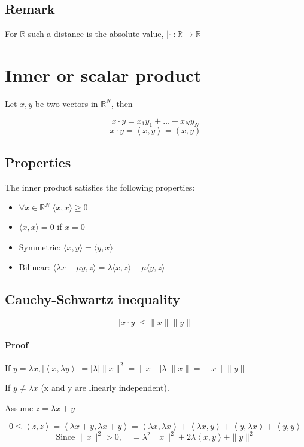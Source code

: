 \documentclass[11pt]{article}
\newcommand{\inner}[2]{\left\langle #1, #2 \right\rangle}
\begin{document}
\subsection*{Remark}
For $\mathbb{R}$ such a distance is the absolute value, $| \cdot | : \mathbb{R} \rightarrow \mathbb{R}$

\section{Inner or scalar product}
Let $x, y$ be two vectors in $\mathbb{R}^N$, then

\[ 
x \cdot y = x_1 y_1 + \dots + x_N y_N
\]
\[
x \cdot y = \inner{x}{y} = (x,y) 
\]

\subsection{Properties}
The inner product satisfies the following properties:
\begin{itemize}
    \item $\forall x \in \mathbb{R}^N \; \langle x, x \rangle \geq 0$
    \item[] $\langle x, x \rangle = 0$ if $x = 0$
    \item Symmetric: $\langle x, y \rangle = \langle y, x \rangle$
    \item Bilinear: $\langle \lambda x + \mu y, z \rangle = \lambda \langle x, z \rangle + \mu \langle y, z \rangle$
\end{itemize}

\subsection{Cauchy-Schwartz inequality}
\[ 
|x \cdot y| \leq \|x\| \|y\|
\]

\paragraph*{Proof}
If $y = \lambda x, |\inner{x}{\lambda y}| = |\lambda| \|x\|^2 = \|x\| |\lambda| \|x\| = \|x\|\|y\|$

If $y \neq \lambda x$ (x and y are linearly independent).

Assume $z = \lambda x + y$

\[ 
0 \leq \inner{z}{z} = \inner{\lambda x + y}{\lambda x + y} = \inner{\lambda x}{\lambda x} + \inner{\lambda x}{y} + \inner{y}{\lambda x} + \inner{y}{y}
\]
\[ 
\text{Since } \|x\|^2 > 0, \quad = \lambda^2 \|x\|^2  + 2\lambda \inner{x}{y} + \|y\|^2
\]
\end{document}
